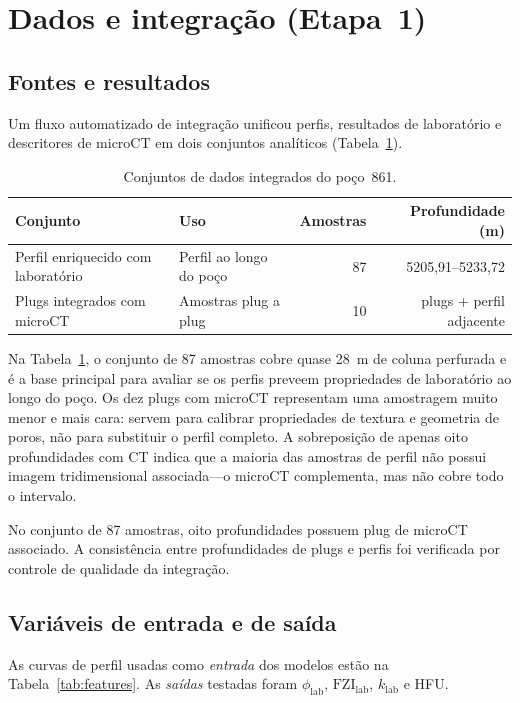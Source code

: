 \documentclass[11pt,a4paper]{article}
\newcommand{\philab}{\ensuremath{\phi_{\mathrm{lab}}}}
\newcommand{\fzilab}{\ensuremath{\mathrm{FZI}_{\mathrm{lab}}}}
\newcommand{\klab}{\ensuremath{k_{\mathrm{lab}}}}
\begin{document}
\section{Dados e integração (Etapa~1)}
\label{sec:dados}

\subsection{Fontes e resultados}

Um fluxo automatizado de integração unificou perfis, resultados
de laboratório e descritores de microCT em dois conjuntos analíticos
(Tabela~\ref{tab:dataset}).

\begin{table}[H]
  \centering
  \caption{Conjuntos de dados integrados do poço~861.}
  \label{tab:dataset}
  \begin{tabular}{llrr}
    \toprule
    Conjunto & Uso & Amostras & Profundidade (m) \\
    \midrule
    Perfil enriquecido com laboratório
      & Perfil ao longo do poço & 87 & 5205,91--5233,72 \\
    Plugs integrados com microCT
      & Amostras plug a plug & 10 & plugs + perfil adjacente \\
    \bottomrule
  \end{tabular}
\end{table}

Na Tabela~\ref{tab:dataset}, o conjunto de 87 amostras cobre quase 28~m de coluna perfurada e é a
base principal para avaliar se os perfis preveem propriedades de
laboratório ao longo do poço.
Os dez plugs com microCT representam uma amostragem muito menor e mais
cara: servem para calibrar propriedades de textura e geometria de poros,
não para substituir o perfil completo.
A sobreposição de apenas oito profundidades com CT indica que a
maioria das amostras de perfil não possui imagem tridimensional
associada---o microCT complementa, mas não cobre todo o intervalo.

No conjunto de 87 amostras, oito profundidades possuem plug de microCT
associado.
A consistência entre profundidades de plugs e perfis foi verificada por
controle de qualidade da integração.

\subsection{Variáveis de entrada e de saída}

As curvas de perfil usadas como \emph{entrada} dos modelos estão na
Tabela~\ref{tab:features}.
As \emph{saídas} testadas foram \philab, \fzilab, \klab{} e HFU.
\end{document}
